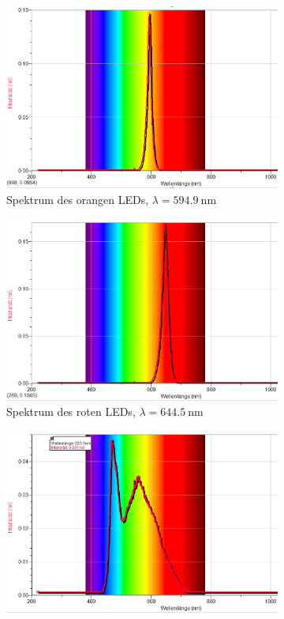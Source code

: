 \begin{figure}[H]
\begin{subfigure}{.3\linewidth}
        \includegraphics[width=\linewidth]{images/spectrum-orange.png}
        \caption{Spektrum des orangen LEDs, $\lambda=\SI{594.9}{\nano\meter}$}
        \label{fig:led-orange}
    \end{subfigure}
    \begin{subfigure}{.3\linewidth}
        \centering
        \includegraphics[width=\linewidth]{images/spectrum-red.png}
        \caption{Spektrum des roten LEDs, $\lambda=\SI{644.5}{\nano\meter}$}
        \label{fig:led-red}
    \end{subfigure}
    \begin{subfigure}{.3\linewidth}
        \centering
        \includegraphics[width=\linewidth]{images/spectrum-white.png}

\end{subfigure}
\end{figure}

